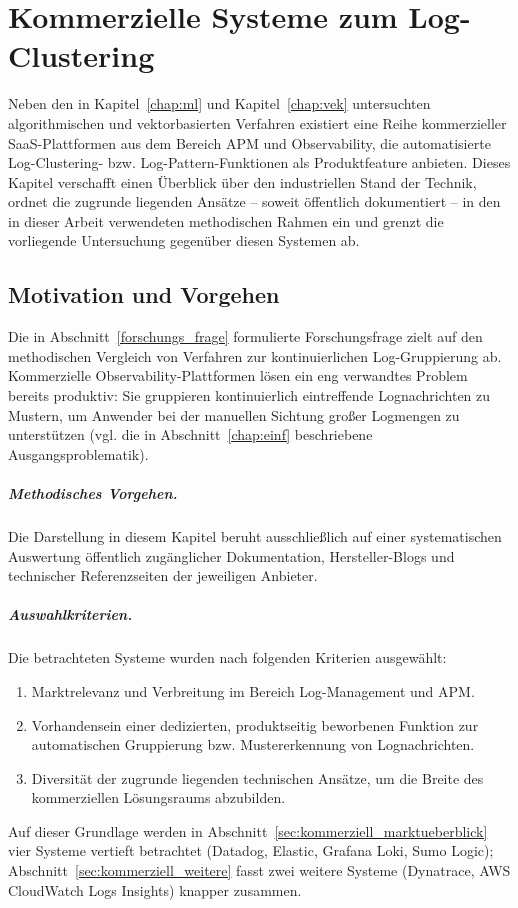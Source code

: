 \chapter{Kommerzielle Systeme zum Log-Clustering}
\label{chap:kommerziell}

Neben den in Kapitel~\ref{chap:ml} und Kapitel~\ref{chap:vek} untersuchten algorithmischen und vektorbasierten Verfahren existiert eine Reihe kommerzieller \ac{SaaS}-Plattformen aus dem Bereich \ac{APM} und Observability, die automatisierte Log-Clustering- bzw. Log-Pattern-Funktionen als Produktfeature anbieten. Dieses Kapitel verschafft einen Überblick über den industriellen Stand der Technik, ordnet die zugrunde liegenden Ansätze -- soweit öffentlich dokumentiert -- in den in dieser Arbeit verwendeten methodischen Rahmen ein und grenzt die vorliegende Untersuchung gegenüber diesen Systemen ab.

\section{Motivation und Vorgehen}
\label{sec:kommerziell_motivation}

Die in Abschnitt~\ref{forschungs_frage} formulierte Forschungsfrage zielt auf den methodischen Vergleich von Verfahren zur kontinuierlichen Log-Gruppierung ab. Kommerzielle Observability-Plattformen lösen ein eng verwandtes Problem bereits produktiv: Sie gruppieren kontinuierlich eintreffende Lognachrichten zu Mustern, um Anwender bei der manuellen Sichtung großer Logmengen zu unterstützen (vgl. die in Abschnitt~\ref{chap:einf} beschriebene Ausgangsproblematik).

\paragraph{Methodisches Vorgehen.}
Die Darstellung in diesem Kapitel beruht ausschließlich auf einer systematischen Auswertung öffentlich zugänglicher Dokumentation, Hersteller-Blogs und technischer Referenzseiten der jeweiligen Anbieter.

\paragraph{Auswahlkriterien.}
Die betrachteten Systeme wurden nach folgenden Kriterien ausgewählt:
\begin{enumerate}
    \item Marktrelevanz und Verbreitung im Bereich Log-Management und \ac{APM}.
    \item Vorhandensein einer dedizierten, produktseitig beworbenen Funktion zur automatischen Gruppierung bzw. Mustererkennung von Lognachrichten.
    \item Diversität der zugrunde liegenden technischen Ansätze, um die Breite des kommerziellen Lösungsraums abzubilden.
\end{enumerate}
Auf dieser Grundlage werden in Abschnitt~\ref{sec:kommerziell_marktueberblick} vier Systeme vertieft betrachtet (Datadog, Elastic, Grafana Loki, Sumo Logic); Abschnitt~\ref{sec:kommerziell_weitere} fasst zwei weitere Systeme (Dynatrace, AWS CloudWatch Logs Insights) knapper zusammen.

